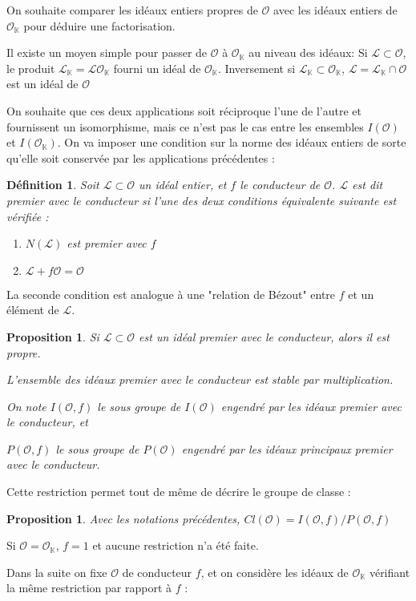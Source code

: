 \documentclass{article}
\newcommand{\K}[0]{\mathbb{K}}
\newcommand{\OR}[0]{\mathcal{O}}
\newcommand{\LR}[0]{\mathcal{L}}
\newtheorem{Prop}[The]{Proposition}
\newtheorem{Def}[The]{Définition}
\begin{document}
On souhaite comparer les idéaux entiers propres de $\OR$ avec les idéaux entiers de $\OR_{\K}$ pour déduire une factorisation. 

Il existe un moyen simple pour passer de $\OR$ à $\OR_{\K}$ au niveau des idéaux: Si $\LR\subset\OR$, le produit $\LR_{\K} = \LR\OR_{\K}$ fourni un idéal de $\OR_{\K}$. Inversement si $\LR_{\K}\subset\OR_{\K}$, $\LR = \LR_{\K}\cap\OR$ est un idéal de $\OR$

On souhaite que ces deux applications soit réciproque l'une de l'autre et fournissent un isomorphisme, mais ce n'est pas le cas entre les ensembles $I(\OR)$ et $I(\OR_{\K})$. On va imposer une condition sur la norme des idéaux entiers de sorte qu'elle soit conservée par les applications précédentes :

\begin{Def}
	Soit $\LR\subset\OR$ un idéal entier, et $f$ le conducteur de $\OR$. $\LR$ est dit premier avec le conducteur si l'une des deux conditions équivalente suivante est vérifiée :
	\begin{enumerate}
		\item $N(\LR)$ est premier avec $f$
		\item $\LR + f\OR = \OR$
	\end{enumerate}
\end{Def}

La seconde condition est analogue à une "relation de Bézout" entre $f$ et un élément de $\LR$.

\begin{Prop}
	Si $\LR\subset\OR$ est un idéal premier avec le conducteur, alors il est propre.
	
	L'ensemble des idéaux premier avec le conducteur est stable par multiplication. 
	
	On note $I(\OR,f)$ le sous groupe de $I(\OR)$ engendré par les idéaux premier avec le conducteur, et
	
	$P(\OR,f)$ le sous groupe de $P(\OR)$ engendré par les idéaux principaux premier avec le conducteur. 
\end{Prop}

Cette restriction permet tout de même de décrire le groupe de classe :

\begin{Prop}
	Avec les notations précédentes, $Cl(\OR) =  I(\OR, f)/P(\OR, f)$
\end{Prop}

Si $\OR = \OR_{\K}$, $f = 1$ et aucune restriction n'a été faite. 

Dans la suite on fixe $\OR$ de conducteur $f$, et on considère les idéaux de $\OR_{\K}$ vérifiant la même restriction par rapport à $f$ :
\end{document}
